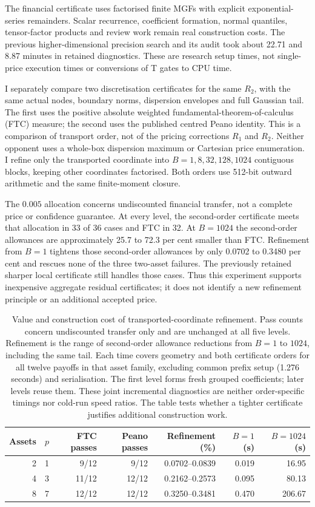 \documentclass[11pt]{article}
\begin{document}
The financial certificate uses factorised finite MGFs with explicit
exponential-series remainders. Scalar recurrence, coefficient formation,
normal quantiles, tensor-factor products and review work remain real
construction costs. The previous higher-dimensional precision search and
its audit took about 22.71 and 8.87 minutes in retained diagnostics.
These are research setup times, not single-price execution times or
conversions of T gates to CPU time.

I separately compare two discretisation certificates for the same $R_2$,
with the same actual nodes, boundary norms, dispersion envelopes and full
Gaussian tail. The first uses the positive absolute weighted
fundamental-theorem-of-calculus (FTC) measure; the second uses the
published centred Peano identity. This is a comparison of transport order,
not of the pricing corrections $R_1$ and $R_2$. Neither opponent uses a
whole-box dispersion maximum or Cartesian price enumeration.
I refine only the transported coordinate into $B=1,8,32,128,1024$
contiguous blocks, keeping other coordinates factorised. Both orders use
512-bit outward arithmetic and the same finite-moment closure.

The $0.005$ allocation concerns undiscounted financial transfer, not a
complete price or confidence guarantee. At every level, the second-order
certificate meets that allocation
in 33 of 36 cases and FTC in 32. At $B=1024$ the second-order allowances
are approximately 25.7 to 72.3 per cent smaller than FTC. Refinement from
$B=1$ tightens those second-order allowances by only 0.0702 to 0.3480
per cent and rescues none of the three two-asset failures. The previously
retained sharper local certificate still handles those cases. Thus this
experiment supports inexpensive aggregate residual certificates; it does
not identify a new refinement principle or an additional accepted price.

\begin{table}[ht]
\centering\small
\begin{tabular}{rrrrrrr}
\toprule
Assets&$p$&FTC passes&Peano passes&Refinement (\%)&$B=1$ (s)&$B=1024$ (s)\\
\midrule
2&1&9/12&9/12&0.0702--0.0839&0.019&16.95\\
4&3&11/12&12/12&0.2162--0.2573&0.095&80.13\\
8&7&12/12&12/12&0.3250--0.3481&0.470&206.67\\
\bottomrule
\end{tabular}
\caption{Value and construction cost of transported-coordinate refinement.
Pass counts concern undiscounted transfer only and are unchanged at all
five levels. Refinement is the range of
second-order allowance reductions from $B=1$ to $1024$, including the same
tail. Each time covers geometry and both certificate orders for all twelve
payoffs in that asset family, excluding common prefix setup (1.276 seconds)
and serialisation. The first level forms fresh grouped coefficients;
later levels reuse them. These joint incremental diagnostics are neither
order-specific timings nor cold-run speed ratios. The table tests whether
a tighter certificate justifies additional construction work.}
\label{tab:certificate-refinement}
\end{table}
\end{document}
